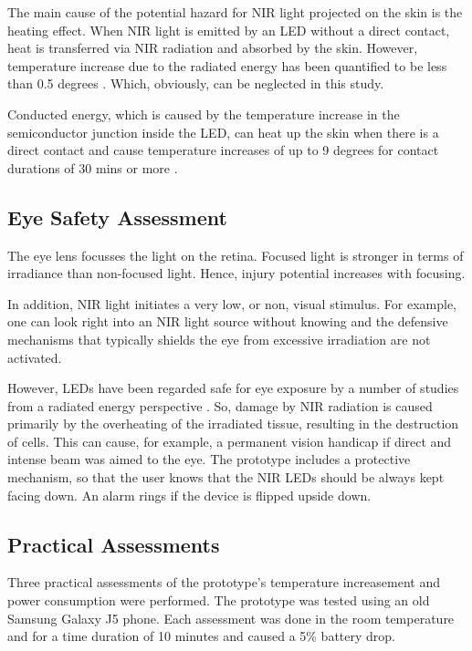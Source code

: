 The main cause of the potential hazard for NIR light projected on the skin is the heating effect. When NIR light is emitted by an LED without a direct contact, heat is transferred via NIR radiation and absorbed by the skin. However, temperature increase due to the radiated energy has been quantified to be less than 0.5 degrees \parencite{ledSafety}. Which, obviously, can be neglected in this study.

Conducted energy, which is caused by the temperature increase in the semiconductor junction inside the LED, can heat up the skin when there is a direct contact and cause temperature increases of up to 9 degrees for contact durations of 30 mins or more \parencite{ledSafety}.

\subsection {Eye Safety Assessment}
The eye lens focusses the light on the retina. Focused light is stronger in terms of irradiance than non-focused light. Hence, injury potential increases with focusing.

In addition, NIR light initiates a very low, or non, visual stimulus. For example, one can look right into an NIR light source without knowing and the defensive mechanisms that typically shields the eye from excessive irradiation are not activated.

However, LEDs have been regarded safe for eye exposure by a number of studies from a radiated energy perspective \parencite{ledEyeSafe1} \parencite{ledEyeSafe2}.
So, damage by NIR radiation is caused primarily by the overheating of the irradiated tissue, resulting in the destruction of cells. This can cause, for example, a permanent vision handicap \parencite{ledEyeSafe3} if direct and intense beam was aimed to the eye.
The prototype includes a protective mechanism, so that the user knows that the NIR LEDs should be always kept facing down. An alarm rings if the device is flipped upside down.


\subsection{Practical Assessments}
Three practical assessments of the prototype’s temperature increasement and power consumption were performed. The prototype was tested using an old Samsung Galaxy J5 phone. Each assessment was done in the room temperature and for a time duration of 10 minutes and caused a 5\% battery drop.

